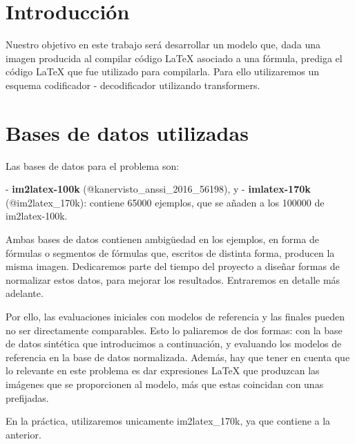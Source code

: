 \documentclass[a4paper, 20pt, dvipsnames]{article}
\begin{document}
{\parskip=2pt
	\tableofcontents
}
\pagebreak

\newpage

\section{Introducción}

Nuestro objetivo en este trabajo será desarrollar un modelo que, dada una imagen producida al compilar código \LaTeX{} asociado a una fórmula, prediga el código \LaTeX{} que fue utilizado para compilarla. Para ello utilizaremos un esquema codificador - decodificador utilizando transformers.


\section{Bases de datos utilizadas}
\label{sec:datasets}

Las bases de datos para el problema son:

- \textbf{im2latex-100k} (@kanervisto\_anssi\_2016\_56198), y
- \textbf{imlatex-170k} (@im2latex\_170k): contiene 65000 ejemplos, que se añaden a los 100000 de im2latex-100k.


Ambas bases de datos contienen ambigüedad en los ejemplos, en forma de fórmulas o segmentos de fórmulas que, escritos de distinta forma, producen la misma imagen. Dedicaremos parte del tiempo del proyecto a diseñar formas de normalizar estos datos, para mejorar los resultados. Entraremos en detalle más adelante.

Por ello, las evaluaciones iniciales con modelos de referencia y las finales pueden no ser directamente comparables. Esto lo paliaremos de dos formas: con la base de datos sintética que introducimos a continuación, y evaluando los modelos de referencia en la base de datos normalizada. Además, hay que tener en cuenta que lo relevante en este problema es dar expresiones \LaTeX{} que produzcan las imágenes que se proporcionen al modelo, más que estas coincidan con unas prefijadas.

En la práctica, utilizaremos unicamente im2latex\_170k, ya que contiene a la anterior.
\end{document}
